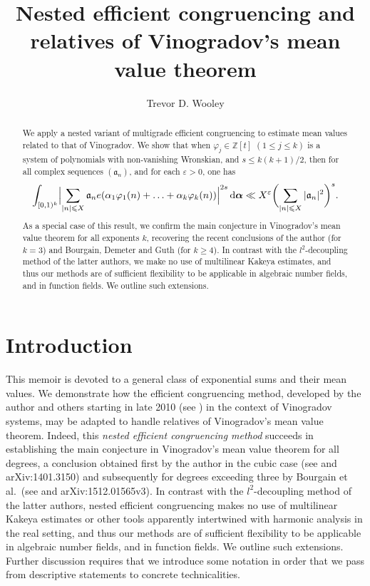 \documentclass[12pt,reqno]{amsart}
\theoremstyle{definition}
\theoremstyle{remark}
\numberwithin{equation}{section}
\def\dbZ{{\mathbb Z}}\def\dbQ{{\mathbb Q}}
\def\gra{{\mathfrak a}}\def\grA{{\mathfrak A}}\def\bfgra{{\boldsymbol \gra}}
\def\alp{{\alpha}} \def\bfalp{{\boldsymbol \alpha}}
\def\eps{\varepsilon}
\def\le{\leqslant} \def\ge{\geqslant} \def\pleq{\preccurlyeq} \def\ple{\prec}
\def\d{{\,{\rm d}}}
\begin{document}
\title[Nested efficient congruencing]{Nested efficient congruencing and relatives of 
Vinogradov's mean value theorem}
\author[Trevor D. Wooley]{Trevor D. Wooley}
\address{School of Mathematics, University of Bristol, University Walk, Clifton, Bristol BS8 
1TW, United Kingdom}
\date{}
\begin{abstract} We apply a nested variant of multigrade efficient congruencing to 
estimate mean values related to that of Vinogradov. We show that when 
$\varphi_j\in \dbZ[t]$ $(1\le j\le k)$ is a system of polynomials with non-vanishing 
Wronskian, and $s\le k(k+1)/2$, then for all complex sequences $(\gra_n)$, and for each 
$\eps>0$, one has
$$\int_{[0,1)^k}\Bigl| \sum_{|n|\le X}\gra_n e(\alp_1\varphi_1(n)+\ldots 
+\alp_k\varphi_k(n))\Bigr|^{2s}\d\bfalp \ll X^\eps \biggl( \sum_{|n|\le X}
|\gra_n|^2\biggr)^s.$$
As a special case of this result, we confirm the main conjecture in Vinogradov's mean 
value theorem for all exponents $k$, recovering the recent conclusions of the author (for 
$k=3$) and Bourgain, Demeter and Guth (for $k\ge 4$). In contrast with the 
$l^2$-decoupling method of the latter authors, we make no use of multilinear Kakeya
estimates, and thus our methods are of sufficient flexibility to be applicable in algebraic 
number fields, and in function fields. We outline such extensions.\end{abstract}
\maketitle

\section{Introduction} This memoir is devoted to a general class of exponential sums and 
their mean values. We demonstrate how the efficient congruencing method, developed by 
the author and others starting in late 2010 (see \cite{Woo2012}) in the context of 
Vinogradov systems, may be adapted to handle relatives of Vinogradov's mean value 
theorem. Indeed, this {\it nested efficient congruencing method} succeeds in establishing 
the main conjecture in Vinogradov's mean value theorem for all degrees, a conclusion 
obtained first by the author in the cubic case (see \cite{Woo2016} and arXiv:1401.3150) 
and subsequently for degrees exceeding three by Bourgain et al.~(see \cite{BDG2016} 
and arXiv:1512.01565v3). In contrast with the $l^2$-decoupling method of the latter 
authors, nested efficient congruencing makes no use of multilinear Kakeya estimates or other 
tools apparently intertwined with harmonic analysis in the real setting, and thus our methods 
are of sufficient flexibility to be applicable in algebraic number fields, and in function fields. 
We outline such extensions. Further discussion requires that we introduce some notation in 
order that we pass from descriptive statements to concrete technicalities.\par
\end{document}
